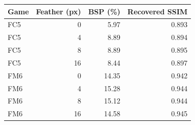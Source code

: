 \begin{tabular}{@{}lrrr@{}}
\toprule
\textbf{Game} & \textbf{Feather (px)} & \textbf{BSP (\%)} & \textbf{Recovered SSIM} \\
\midrule
FC5 & 0 & 5.97 & 0.893 \\
FC5 & 4 & 8.89 & 0.894 \\
FC5 & 8 & 8.89 & 0.895 \\
FC5 & 16 & 8.44 & 0.897 \\
\midrule
FM6 & 0 & 14.35 & 0.942 \\
FM6 & 4 & 15.28 & 0.944 \\
FM6 & 8 & 15.12 & 0.944 \\
FM6 & 16 & 14.58 & 0.945 \\
\bottomrule
\end{tabular}
